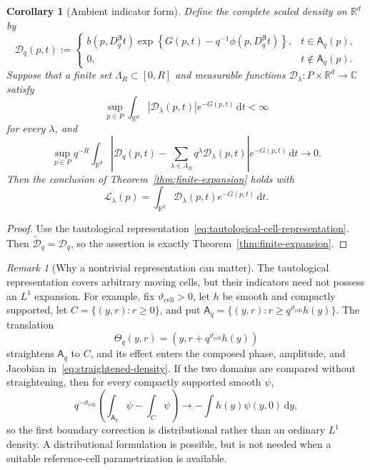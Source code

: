 \documentclass[11pt]{amsart}
\numberwithin{equation}{section}
\newtheorem{corollary}[theorem]{Corollary}
\theoremstyle{definition}
\theoremstyle{remark}
\newtheorem{remark}[theorem]{Remark}
\newcommand{\R}{\mathbb{R}}
\newcommand{\C}{\mathbb{C}}
\newcommand{\dd}{\,\mathrm{d}}
\newcommand{\cD}{\mathcal{D}}
\newcommand{\Afib}{\mathsf{A}}
\newcommand{\cL}{\mathcal{L}}
\begin{document}
\begin{corollary}[Ambient indicator form]
\label{cor:ambient-indicator-expansion}
Define the complete scaled density on $\R^d$ by
\begin{equation}\label{eq:Dq}
 \cD_q(p,t):=
 \begin{cases}
 b(p,D_q^{\bm\beta}t)
 \exp\left\{G(p,t)-q^{-1}\phi(p,D_q^{\bm\beta}t)\right\},
   &t\in \Afib_q(p),\\
 0,&t\notin \Afib_q(p).
 \end{cases}
\end{equation}
Suppose that a finite set $\Lambda_R\subset[0,R]$ and measurable functions
$\cD_\lambda:P\times\R^d\to\C$ satisfy
\begin{equation}\label{eq:D-moments-ambient}
 \sup_{p\in P}\int_{\R^d}|\cD_\lambda(p,t)|e^{-G(p,t)}\dd t<\infty
\end{equation}
for every $\lambda$, and
\begin{equation}\label{eq:scaled-L1-expansion-ambient}
 \sup_{p\in P}q^{-R}\int_{\R^d}
 \left|\cD_q(p,t)-
 \sum_{\lambda\in\Lambda_R}q^\lambda \cD_\lambda(p,t)\right|
 e^{-G(p,t)}\dd t\longrightarrow0.
\end{equation}
Then the conclusion of Theorem~\ref{thm:finite-expansion} holds with
\begin{equation}\label{eq:L-lambda-density}
 \cL_\lambda(p)=\int_{\R^d}\cD_\lambda(p,t)e^{-G(p,t)}\dd t.
\end{equation}
\end{corollary}

\begin{proof}
Use the tautological representation~\eqref{eq:tautological-cell-representation}.
Then $\widetilde{\cD}_q=\cD_q$, so the assertion is exactly
Theorem~\ref{thm:finite-expansion}.
\end{proof}

\begin{remark}[Why a nontrivial representation can matter]\label{rem:nontrivial-cell-representation}
The tautological representation covers arbitrary moving cells, but their
indicators need not possess an $L^1$ expansion.  For example, fix
$\vartheta_{\mathrm{cell}}>0$, let $h$ be smooth and compactly supported, let
$C=\{(y,r):r\ge0\}$, and put
$\Afib_q=\{(y,r):r\ge q^{\vartheta_{\mathrm{cell}}}h(y)\}$.  The translation
\[
 \Theta_q(y,r)=(y,r+q^{\vartheta_{\mathrm{cell}}}h(y))
\]
straightens $\Afib_q$ to $C$, and its effect enters the composed phase, amplitude,
and Jacobian in~\eqref{eq:straightened-density}.  If the two domains are
compared without straightening, then for every compactly supported smooth
$\psi$,
\[
 q^{-\vartheta_{\mathrm{cell}}}\left(\int_{\Afib_q}\psi-\int_C\psi\right)
 \longrightarrow-\int h(y)\psi(y,0)\dd y,
\]
so the first boundary correction is distributional rather than an ordinary
$L^1$ density.  A distributional formulation is possible, but is not needed
when a suitable reference-cell parametrization is available.
\end{remark}
\end{document}
